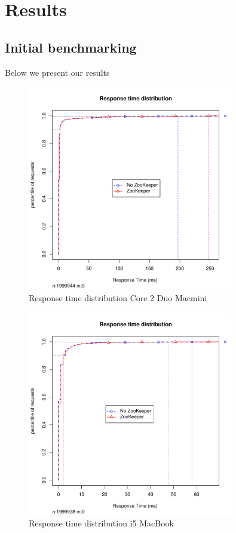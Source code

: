 \section{Results}

\subsection{Initial benchmarking}
Below we present our results

\begin{figure}[h]
    \centering
    \includegraphics[width=0.8\textwidth]{results/distribution/distribution_macmini}
    \caption{Response time distribution Core 2 Duo Macmini}
    \label{fig:dist_knut}
\end{figure}

\begin{figure}[h]
    \centering
    \includegraphics[width=0.8\textwidth]{results/distribution/distribution_knut}
    \caption{Response time distribution i5 MacBook}
    \label{fig:dist_knut}
\end{figure}

